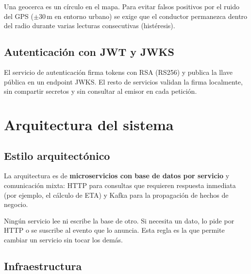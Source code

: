 \documentclass[10pt,letterpaper,twocolumn,oneside]{report}
\begin{document}
Una geocerca es un círculo en el mapa. Para evitar falsos positivos por el ruido del GPS
($\pm 30$\,m en entorno urbano) se exige que el conductor permanezca dentro del radio durante
varias lecturas consecutivas (histéresis).

\section{Autenticación con JWT y JWKS}

El servicio de autenticación firma tokens con RSA (RS256) y publica la llave pública en un
endpoint JWKS. El resto de servicios validan la firma localmente, sin compartir secretos y sin
consultar al emisor en cada petición.

\chapter{Arquitectura del sistema}

\section{Estilo arquitectónico}

La arquitectura es de \textbf{microservicios con base de datos por servicio} y comunicación mixta:
HTTP para consultas que requieren respuesta inmediata (por ejemplo, el cálculo de ETA) y Kafka
para la propagación de hechos de negocio.

\begin{nota}
Ningún servicio lee ni escribe la base de otro. Si necesita un dato, lo pide por HTTP o se
suscribe al evento que lo anuncia. Esta regla es la que permite cambiar un servicio sin tocar los
demás.
\end{nota}

\section{Infraestructura}
\end{document}
